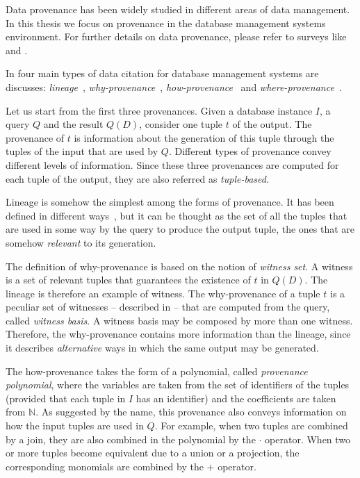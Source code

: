 Data provenance has been widely studied in different areas of data management. 
In this thesis we focus on provenance in the database management systems environment. For further details on data provenance, please refer to surveys like \citep{CheneyProvSurvey} and \citep{SimmhanPG05}.

In \citep{CheneyProvSurvey} four main types of data citation for database management systems are discusses: \emph{lineage}~\citep{lineageCui}, \emph{why-provenance}~\citep{WhyProvBuneman}, \emph{how-provenance}~\citep{howProvenanceGreen} and \emph{where-provenance}~\citep{WhyProvBuneman}.

Let us start from the first three provenances. Given a database instance $I$, a query $Q$ and the result $Q(D)$, consider one tuple $t$ of the output. 
The provenance of $t$ is information about the generation of this tuple through the tuples of the input that are used by $Q$. Different types of provenance convey different levels of information. Since these three provenances are computed for each tuple of the output, they are also referred as \emph{tuple-based}.

Lineage is somehow the simplest among the forms of provenance. It has been defined in different ways~\citep{CheneyProvSurvey}, but it can be thought as the set of all the tuples that are used in some way by the query to produce the output tuple, the ones that are somehow \emph{relevant} to its generation. 

The definition of why-provenance is based on the notion of \emph{witness set}. A witness is a set of relevant tuples that guarantees the existence of $t$ in $Q(D)$. The lineage is therefore an example of witness. The why-provenance of a tuple $t$ is a peculiar set of witnesses  -- described in \citep{WhyProvBuneman} -- that are computed from the query, called \emph{witness basis}. 
A witness basis may be composed by more than one witness. 
Therefore, the why-provenance contains more information than the lineage, since it describes \emph{alternative} ways in which the same output may be generated. 

The how-provenance takes the form of a polynomial, called \emph{provenance polynomial}, where the variables are taken from the set of identifiers of the tuples (provided that each tuple in $I$ has an identifier) and the coefficients are taken from $\mathbb{N}$. 
As suggested by the name, this provenance also conveys information on how the input tuples are used in $Q$. For example, when two tuples are combined by a join, they are also combined in the polynomial by the $\cdot$ operator. When two or more tuples become equivalent due to a union or a projection, the corresponding monomials are combined by the $+$ operator.

